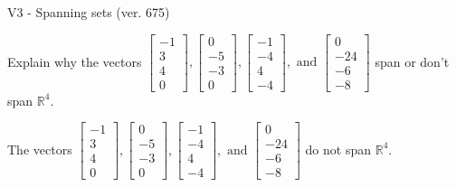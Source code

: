 \begin{exercise}
  \begin{exerciseTitle}V3 - Spanning sets (ver. 675)\end{exerciseTitle}
  \begin{exerciseStatement}
    Explain why the vectors \(\left[\begin{array}{r}
-1 \\
3 \\
4 \\
0
\end{array}\right] , \left[\begin{array}{r}
0 \\
-5 \\
-3 \\
0
\end{array}\right] , \left[\begin{array}{r}
-1 \\
-4 \\
4 \\
-4
\end{array}\right] , \text{ and } \left[\begin{array}{r}
0 \\
-24 \\
-6 \\
-8
\end{array}\right]\) span or don't span \(\mathbb{R}^4\). 
	


  \end{exerciseStatement}
  \begin{exerciseAnswer}
   The vectors \(\left[\begin{array}{r}
-1 \\
3 \\
4 \\
0
\end{array}\right] , \left[\begin{array}{r}
0 \\
-5 \\
-3 \\
0
\end{array}\right] , \left[\begin{array}{r}
-1 \\
-4 \\
4 \\
-4
\end{array}\right] , \text{ and } \left[\begin{array}{r}
0 \\
-24 \\
-6 \\
-8
\end{array}\right]\) 
  	 do not  
	span \(\mathbb{R}^4\).
  


  \end{exerciseAnswer}
\end{exercise}